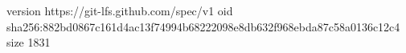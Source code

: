 version https://git-lfs.github.com/spec/v1
oid sha256:882bd0867c161d4ac13f74994b68222098e8db632f968ebda87c58a0136c12c4
size 1831

